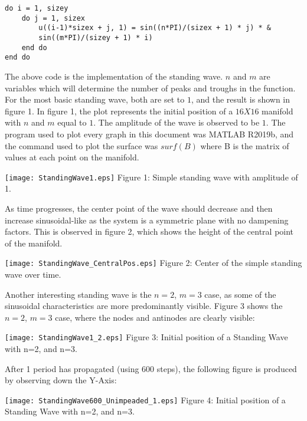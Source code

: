 \documentclass{article}
\begin{document}
\begin{multicols}{2}
\begin{verbatim}
do i = 1, sizey
    do j = 1, sizex
        u((i-1)*sizex + j, 1) = sin((n*PI)/(sizex + 1) * j) * &
        sin((m*PI)/(sizey + 1) * i)
    end do
end do
\end{verbatim}

The above code is the implementation of the standing wave. $n$ and $m$ are variables which will determine the number of peaks and troughs in the function. For the most basic standing wave, both are set to $1$, and the result is shown in figure 1. In figure 1, the plot represents the initial position of a $16 X 16$ manifold with $n$ and $m$ equal to $1$. The amplitude of the wave is observed to be $1$. The program used to plot every graph in this document was MATLAB R2019b, and the command used to plot the surface was $surf(B)$ where B is the matrix of values at each point on the manifold.

\begin{center}
\texttt{[image: StandingWave1.eps]}
\scriptsize{
Figure 1: Simple standing wave with amplitude of 1.
}
\end{center}

As time progresses, the center point of the wave should decrease and then increase sinusoidal-like as the system is a symmetric plane with no dampening factors. This is observed in figure 2, which shows the height of the central point of the manifold.

\begin{center}
\texttt{[image: StandingWave\_CentralPos.eps]}
\scriptsize{
Figure 2: Center of the simple standing wave over time.
}
\end{center}

Another interesting standing wave is the $n=2$, $m=3$ case, as some of the sinusoidal characteristics are more predominantly visible. Figure 3 shows the $n=2$, $m=3$ case, where the nodes and antinodes are clearly visible:

\begin{center}
\texttt{[image: StandingWave1\_2.eps]}
\scriptsize{
Figure 3: Initial position of a Standing Wave with n=2, and n=3.
}
\end{center}

After 1 period has propagated (using 600 steps), the following figure is produced by observing down the Y-Axis:

\begin{center}
\texttt{[image: StandingWave600\_Unimpeaded\_1.eps]}
\scriptsize{
Figure 4: Initial position of a Standing Wave with n=2, and n=3.
}
\end{center}


\end{multicols}
\end{document}

